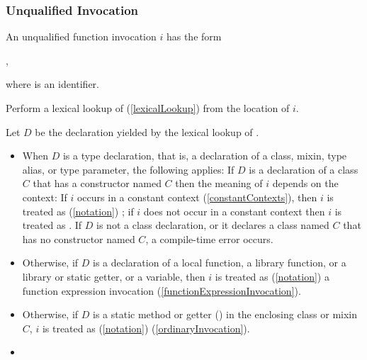 \documentclass[makeidx]{article}
\begin{document}
{\subsubsection{Unqualified Invocation}

\LMHash{}%
An unqualified function invocation $i$ has the form

\noindent
{},

\noindent
where \id{} is an identifier.


\LMHash{}%
Perform a lexical lookup of \id{}
(\ref{lexicalLookup})
from the location of $i$.

\LMHash{}%
Let $D$ be the declaration yielded by the lexical lookup of \id{}.

\begin{itemize}
\item
  When $D$ is a type declaration, that is,
  a declaration of a class, mixin, type alias, or type parameter,
  the following applies:
  If $D$ is a declaration of a class $C$
  that has a constructor named $C$
  then the meaning of $i$ depends on the context:
  If $i$ occurs in a constant context
  (\ref{constantContexts}),
  then $i$ is treated as
  (\ref{notation})
  ;
  if $i$ does not occur in a constant context
  then $i$ is treated as .
  If $D$ is not a class declaration,
  or it declares a class named $C$ that has no constructor named $C$,
  a compile-time error occurs.
\item
  Otherwise, if $D$ is a declaration of
  a local function,
  a library function, or
  a library or static getter, or a variable,
  then $i$ is treated as
  (\ref{notation})
  a function expression invocation
  (\ref{functionExpressionInvocation}).
\item
  Otherwise, if $D$ is
  a static method or getter
  ()
  in the enclosing class or mixin $C$,
  $i$ is treated as
  (\ref{notation})
  (\ref{ordinaryInvocation}).
\item
\end{itemize}
\vspace{-2ex}
\EndCase

}
\end{document}
